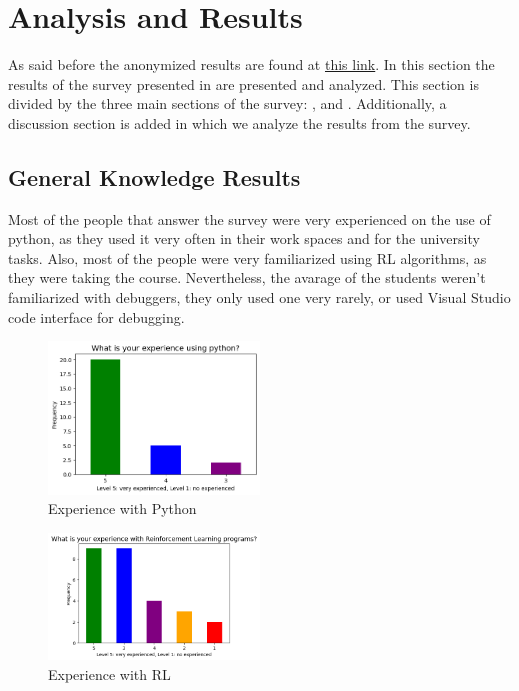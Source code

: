 
\chapter{Analysis and Results}
\label{cha:results}
As said before the anonymized results are found at \href{https://uniandes-my.sharepoint.com/:x:/g/personal/la_rodriguez_uniandes_edu_co/ESDy89Q-PgVBpYHEZ_CDh_IBhjhS35VFqNrlEjVw_ShY1w?e=lm319K}{this link}.
In this section the results of the survey presented in  are presented and analyzed. This section 
is divided by the three main sections of the survey: ,  and 
. Additionally, a discussion  section is added in which we analyze the results 
from the survey.

\section{General Knowledge Results}
\label{sec:general-knowledge}
Most of the people that answer the survey were very experienced on the use of python, as they used it very often in 
their work spaces and for the university tasks. Also, most of the people were very familiarized using \ac{RL} algorithms,
as they were taking the course. Nevertheless, the avarage of the students weren't familiarized with 
debuggers, they only used one very rarely, or used Visual Studio code interface for debugging.

\begin{figure}[!h]
    \centering
    \includegraphics[width=0.5\textwidth]{figures/experience-python.png}
    \caption{Experience with Python}
    \label{fig:exp-py}
\end{figure}

\begin{figure}[!h]
    \centering
    \includegraphics[width=0.5\textwidth]{figures/experience-rl.png}
    \caption{Experience with RL}
    \label{fig:exp-rl}
\end{figure}

